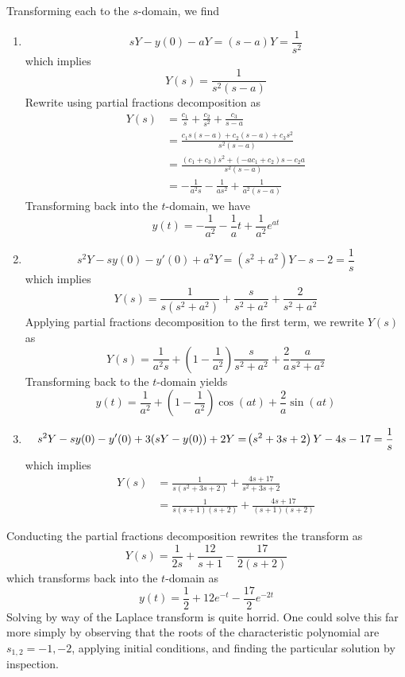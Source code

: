 \documentclass[a4paper]{article}
\begin{document}
Transforming each to the \( s  \)-domain, we find
\begin{enumerate}[label=(\alph*)]
	\item 
	\[
		sY - y \!\left( 0  \right) - aY = \!\left( s - a  \right) Y = \frac{1}{s^{2}}
	\]
	which implies
	\[
		Y \!\left( s  \right) = \frac{1}{s^{2}\!\left( s - a \right)} 
	\]
	Rewrite using partial fractions decomposition as 
	\begin{align*}
		Y \!\left( s  \right) & = \frac{c_{1}}{s } + \frac{c_{2}}{s^{2}} + \frac{c_{3}}{s - a } \\
		 & = \frac{c_{1}s \!\left( s - a  \right) + c_{2}\!\left( s - a  \right) + c_{3}s^{2}}{s^{2}\!\left( s - a  \right)} \\ 
		 & = \frac{\!\left( c_{1} + c_{3} \right)s^{2} + \!\left( -ac_{1} + c_{2} \right)s - c_{2}a }{s^{2}\!\left( s - a  \right)} \\
		 & = -\frac{1}{a^{2}s } - \frac{1}{as^{2}} + \frac{1}{a^{2}\!\left( s - a \right)}
	\end{align*}
	Transforming back into the \( t  \)-domain, we have
	\[
		y \!\left( t  \right) = -\frac{1}{a^{2}} - \frac{1}{a }t + \frac{1}{a^{2}}e^{at} 
	\]
	\item 
	\[
		s^{2}Y - sy \!\left( 0 \right) - y'\!\left( 0 \right) + a^{2}Y = \!\left( s^{2} + a^{2} \right)Y - s - 2 = \frac{1}{s}
	\]
	which implies
	\[
		Y \!\left( s  \right) = \frac{1}{s \!\left( s^{2} + a^{2} \right)} + \frac{s }{s^{2} + a^{2}} + \frac{2}{s^{2} + a^{2}} 
	\]
	Applying partial fractions decomposition to the first term, we rewrite \( Y \!\left( s  \right) \) as 
	\[
		Y \!\left( s  \right) = \frac{1}{a^{2}s} + \!\left( 1 - \frac{1}{a^{2}} \right) \frac{s }{s^{2} + a^{2}} + \frac{2}{a } \frac{a }{s^{2} + a^{2}}
	\]
	Transforming back to the \( t  \)-domain yields
	\[
		y \!\left( t  \right) = \frac{1}{a^{2}} + \!\left( 1 - \frac{1}{a^{2}} \right)\cos\!\left(at \right) + \frac{2}{a} \sin\!\left(at\right)  
	\]
	\item
	\[
		s^{2}Y - sy \!\left( 0 \right) - y'\!\left( 0 \right) + 3 \!\left( sY - y \!\left( 0 \right) \right) + 2Y = \!\left( s^{2} + 3s + 2 \right)Y - 4s - 17 = \frac{1}{s } \\
	\]
	which implies
	\begin{align*}
		Y \!\left( s  \right) & = \frac{1}{s \!\left( s^{2} + 3s + 2 \right)} + \frac{4s + 17}{s^{2} + 3s + 2} \\
				      & = \frac{1}{s \!\left( s + 1 \right)\!\left( s + 2 \right)} + \frac{4s + 17}{\!\left( s + 1 \right)\!\left( s + 2 \right)}
	\end{align*}
\end{enumerate}
Conducting the partial fractions decomposition rewrites the transform as 
\[
	Y \!\left( s  \right) = \frac{1}{2s} + \frac{12}{s + 1} - \frac{17}{2 \!\left( s + 2 \right)} 
\]
which transforms back into the \( t  \)-domain as 
\[
	y \!\left( t  \right) = \frac{1}{2} + 12e^{-t } - \frac{17}{2}e^{-2t} 
\]
Solving by way of the Laplace transform is quite horrid. One could solve this far more simply by observing that the roots of the characteristic polynomial are \( s_{1,2} = -1, -2 \), applying initial conditions, and finding the particular solution by inspection.
\end{document}
